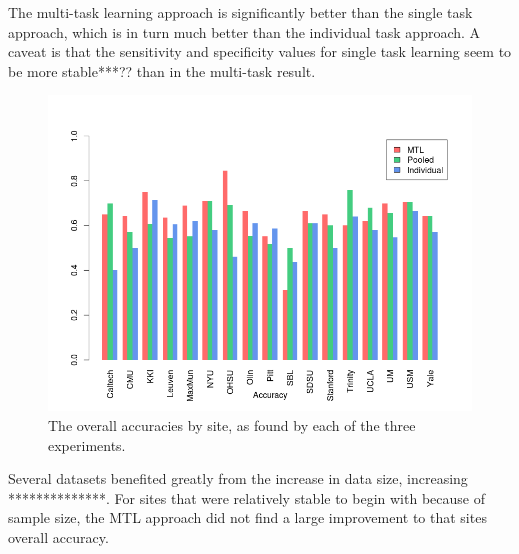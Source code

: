 \documentclass{llncs}
\begin{document}
The multi-task learning approach is significantly better than the single task approach, which is in turn much better than the individual task approach. A caveat is that the sensitivity and specificity values for single task learning seem to be more stable***?? than in the multi-task result. 
\begin{figure}
	\centering
	\includegraphics[scale = .6]{acc_bar.png}
	\caption{The overall accuracies by site, as found by each of the three experiments. }
	\label{fig:acc_bar}
\end{figure}


Several datasets benefited greatly from the increase in data size, increasing **************.  For sites that were relatively stable to begin with because of sample size, the MTL approach did not find a large improvement to that sites overall accuracy.
 
\end{document}

